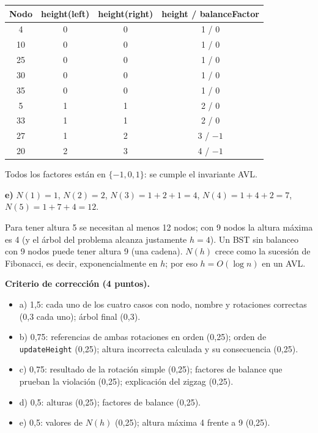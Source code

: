 \documentclass[11pt,a4paper]{article}
\begin{document}
\begin{center}
\small
\begin{tabular}{cccc}
\toprule
\textbf{Nodo} & \textbf{height(left)} & \textbf{height(right)} & \textbf{height} / \textbf{balanceFactor} \\
\midrule
4 & 0 & 0 & 1 / 0 \\
10 & 0 & 0 & 1 / 0 \\
25 & 0 & 0 & 1 / 0 \\
30 & 0 & 0 & 1 / 0 \\
35 & 0 & 0 & 1 / 0 \\
5 & 1 & 1 & 2 / 0 \\
33 & 1 & 1 & 2 / 0 \\
27 & 1 & 2 & 3 / $-1$ \\
20 & 2 & 3 & 4 / $-1$ \\
\bottomrule
\end{tabular}
\end{center}
Todos los factores están en $\{-1, 0, 1\}$: se cumple el invariante AVL.

\textbf{e)} $N(1) = 1$, $N(2) = 2$, $N(3) = 1 + 2 + 1 = 4$, $N(4) = 1 + 4 + 2 = 7$, $N(5) = 1 + 7 + 4 = 12$.

Para tener altura 5 se necesitan al menos 12 nodos; con 9 nodos la altura máxima es 4 (y el árbol del problema alcanza justamente $h = 4$). Un BST sin balanceo con 9 nodos puede tener altura 9 (una cadena). $N(h)$ crece como la sucesión de Fibonacci, es decir, exponencialmente en $h$; por eso $h = O(\log n)$ en un AVL.

\textbf{Criterio de corrección (4 puntos).}
\begin{itemize}[itemsep=0pt]
\item a) 1,5: cada uno de los cuatro casos con nodo, nombre y rotaciones correctas (0,3 cada uno); árbol final (0,3).
\item b) 0,75: referencias de ambas rotaciones en orden (0,25); orden de \texttt{updateHeight} (0,25); altura incorrecta calculada y su consecuencia (0,25).
\item c) 0,75: resultado de la rotación simple (0,25); factores de balance que prueban la violación (0,25); explicación del zigzag (0,25).
\item d) 0,5: alturas (0,25); factores de balance (0,25).
\item e) 0,5: valores de $N(h)$ (0,25); altura máxima 4 frente a 9 (0,25).
\end{itemize}

\newpage
\end{document}
